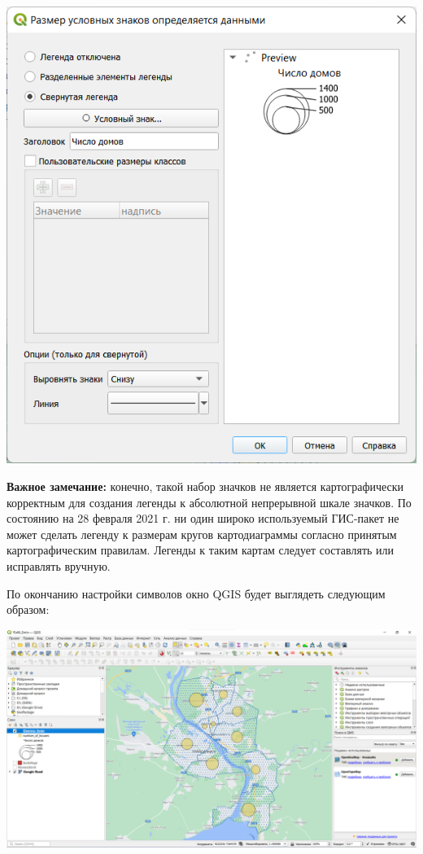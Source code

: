 \documentclass[
  12pt,
]{book}
\begin{document}
\includegraphics{images/Ex05_Vectorization/diagram2.png}

\textbf{Важное замечание:} конечно, такой набор значков не является картографически корректным для создания легенды к абсолютной непрерывной шкале значков. По состоянию на 28 февраля 2021 г. ни один широко используемый ГИС-пакет не может сделать легенду к размерам кругов картодиаграммы согласно принятым картографическим правилам. Легенды к таким картам следует составлять или исправлять вручную.

По окончанию настройки символов окно QGIS будет выглядеть следующим образом:

\includegraphics{images/Ex05_Vectorization/map_diagrams.png}
\end{document}
